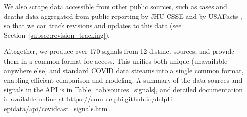 \documentclass[9pt,twocolumn,twoside,lineno]{pnas-new}
\begin{document}
\medskip
We also scrape data accessible from other public sources, such as cases and
deaths data aggregated from public reporting by JHU CSSE \cite{Dong:2020} and by
USAFacts \cite{USAFacts}, so that we can track revisions and updates to this data
(see Section~\ref{subsec:revision_tracking}).

Altogether, we produce over 170 signals from 12 distinct sources, and provide
them in a common format foc access. This unifies both unique (unavailable
anywhere else) and standard COVID data streams into a single common 
format, enabling efficient comparison and modeling. A summary of the data
sources and signals in the API is in Table~\ref{tab:sources_signals}, and
detailed documentation is available online at
\url{https://cmu-delphi.github.io/delphi-epidata/api/covidcast_signals.html}. 
\end{document}
